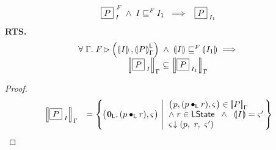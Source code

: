 \begin{lemma}
%
\[
	\boxed{P}_{\; I}^{\ F_{}} \;\land\; I \sqsubseteq^{F_{}} I_1 \;\implies\;\; \boxed{P}_{\; I_1}
\]
%
\textbf{RTS.} 
\[
\begin{array}{l}
	\for{\lenv} 
		\fence{} \fences \left(\intermediateSemI{I}, \semL[\lenv]{P}\right) 
		\;\land\; 
		\intermediateSemI{I} \weakenI{\fence{}} \intermediateSemI{I_1} 
		\implies\\
	  \hspace*{2cm}\sem[\lenv]{\shared{P}{I}} \subseteq  \sem[\lenv]{\shared{P}{I_1}}
\end{array}
\]
%
\begin{proof}
\[
\begin{array}{r l}
	\sem[\lenv]{\shared{P}{I}} &
	= \left\{
	\hspace*{-0.2cm}
	\begin{array}{l | l}
		\left(
		\hspace*{-0.15cm}
		\begin{array}{l}
		\unitL,
		(p \composeL r)
		, \amod{}
		\end{array}
		\hspace*{-0.15cm}
		\right)
		&
		\hspace*{-0.1cm}
		\begin{array}{l}
			\left(
			\hspace*{-0.15cm}
			\begin{array}{l}
			p, 
			(p \composeL r)
			, \amod{}
			\end{array}
			\hspace*{-0.15cm}
			\right) \in \sem[\lenv]{P}\\
			

			
			\land\; r \in \LState \;\;\land\;\; \intermediateSemI{I} = \amod{}'\\
			
			\extendsAM{\amod{}}{p}{\ r}{\ \amod{}'}
		\end{array}
		\hspace*{-0.1cm}
	\end{array}
	\hspace*{-0.2cm}
	\right\} \\
	
	
	

\end{array}\]
\end{proof}
\end{lemma}
